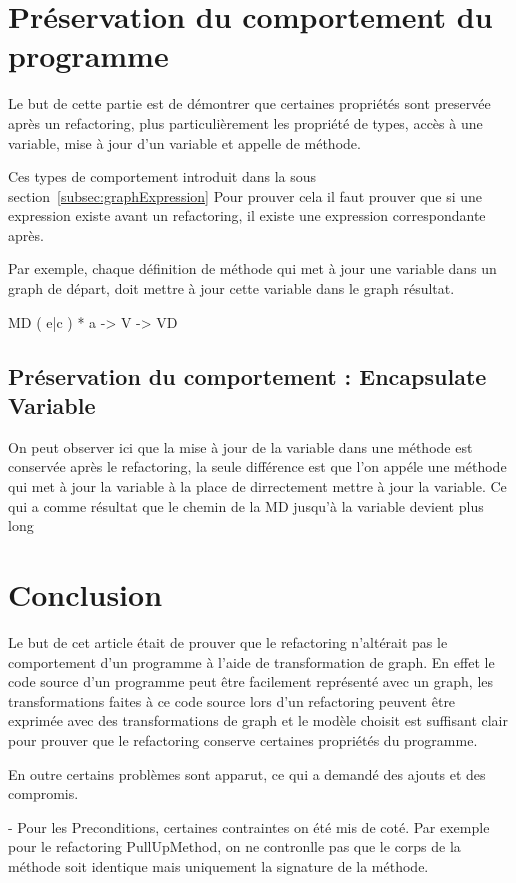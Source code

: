 \documentclass[a4paper, 12pt]{article}
\begin{document}
\begin{enumerate}
\section{Préservation du comportement du programme}

Le but de cette partie est de démontrer que certaines propriétés sont preservée après un refactoring, plus particulièrement les propriété de types, accès à une variable, mise à jour d'un variable et appelle de méthode.

Ces types de comportement introduit dans la sous section~\ref{subsec:graphExpression} 
Pour prouver cela il faut prouver que si une expression existe avant un refactoring, il existe une expression correspondante après. 

Par exemple, chaque définition de méthode qui met à jour une variable dans un graph de départ, doit mettre à jour cette variable dans le graph résultat.

MD ( e|c ) * a -> V -> VD

\subsection{Préservation du comportement : Encapsulate Variable}

On peut observer ici que la mise à jour de la variable dans une méthode est conservée après le refactoring, la seule différence est que l'on appéle une méthode qui met à jour la variable à la place de
dirrectement mettre à jour la variable. Ce qui a comme résultat que le chemin de la MD jusqu'à la variable devient plus long


\section{Conclusion}

Le but de cet article était de prouver que le refactoring n'altérait pas le comportement d'un programme à l'aide de transformation de graph. En effet le code source d'un programme peut être facilement représenté avec un graph, les transformations faites à ce code source lors d'un refactoring peuvent être exprimée avec des transformations de graph et le modèle choisit est suffisant clair pour prouver que le refactoring conserve certaines propriétés du programme.

En outre certains problèmes sont apparut, ce qui a demandé des ajouts et des compromis. 

- Pour les Preconditions, certaines contraintes on été mis de coté. Par exemple pour le refactoring PullUpMethod, on ne contronlle pas que le corps de la méthode soit identique mais uniquement la signature de la méthode.


\end{enumerate}
\end{document}
